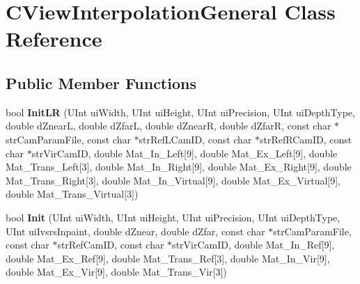 \hypertarget{class_c_view_interpolation_general}{}\section{C\+View\+Interpolation\+General Class Reference}
\label{class_c_view_interpolation_general}
\subsection*{Public Member Functions}
\begin{DoxyCompactItemize}
\item 
\mbox{\label{class_c_view_interpolation_general_a272199dda7ab7bb53df136d33a26d975}} 
bool {\bfseries Init\+LR} (U\+Int ui\+Width, U\+Int ui\+Height, U\+Int ui\+Precision, U\+Int ui\+Depth\+Type, double d\+ZnearL, double d\+ZfarL, double d\+ZnearR, double d\+ZfarR, const char $\ast$str\+Cam\+Param\+File, const char $\ast$str\+Ref\+L\+Cam\+ID, const char $\ast$str\+Ref\+R\+Cam\+ID, const char $\ast$str\+Vir\+Cam\+ID, double Mat\+\_\+\+In\+\_\+\+Left\mbox{[}9\mbox{]}, double Mat\+\_\+\+Ex\+\_\+\+Left\mbox{[}9\mbox{]}, double Mat\+\_\+\+Trans\+\_\+\+Left\mbox{[}3\mbox{]}, double Mat\+\_\+\+In\+\_\+\+Right\mbox{[}9\mbox{]}, double Mat\+\_\+\+Ex\+\_\+\+Right\mbox{[}9\mbox{]}, double Mat\+\_\+\+Trans\+\_\+\+Right\mbox{[}3\mbox{]}, double Mat\+\_\+\+In\+\_\+\+Virtual\mbox{[}9\mbox{]}, double Mat\+\_\+\+Ex\+\_\+\+Virtual\mbox{[}9\mbox{]}, double Mat\+\_\+\+Trans\+\_\+\+Virtual\mbox{[}3\mbox{]})
\item 
\mbox{\label{class_c_view_interpolation_general_a334f4c081d89b8e73b92a8be0c51419e}} 
bool {\bfseries Init} (U\+Int ui\+Width, U\+Int ui\+Height, U\+Int ui\+Precision, U\+Int ui\+Depth\+Type, U\+Int ui\+Ivsrs\+Inpaint, double d\+Znear, double d\+Zfar, const char $\ast$str\+Cam\+Param\+File, const char $\ast$str\+Ref\+Cam\+ID, const char $\ast$str\+Vir\+Cam\+ID, double Mat\+\_\+\+In\+\_\+\+Ref\mbox{[}9\mbox{]}, double Mat\+\_\+\+Ex\+\_\+\+Ref\mbox{[}9\mbox{]}, double Mat\+\_\+\+Trans\+\_\+\+Ref\mbox{[}3\mbox{]}, double Mat\+\_\+\+In\+\_\+\+Vir\mbox{[}9\mbox{]}, double Mat\+\_\+\+Ex\+\_\+\+Vir\mbox{[}9\mbox{]}, double Mat\+\_\+\+Trans\+\_\+\+Vir\mbox{[}3\mbox{]})
\item 
\mbox{\label{class_c_view_interpolation_general_a3d606b4aab016cff1574260ac3474c68}} 

\end{DoxyCompactItemize}
